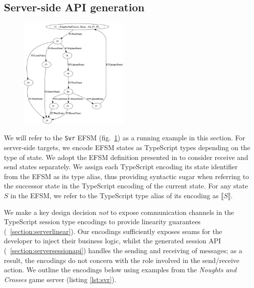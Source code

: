 \documentclass[submission,copyright,creativecommons]{eptcs}
\newcommand{\sectionref}[1]{\textsection~\ref{#1}}
\begin{document}
\subsection{Server-side API generation}
\label{section:server}

\begin{figure}
  \begin{center}
    \includegraphics[width=0.48\textwidth]{figures/efsm_svr.png}
  \end{center}

  \label{fig:efsmsvr}
\end{figure}

We will refer to the \texttt{Svr} EFSM (fig.~\ref{fig:efsmsvr}) as a running example in this section. For server-side targets, we encode EFSM states as TypeScript types depending on the type of state. We adopt the EFSM definition presented in \cite{Hybrid2016} to consider receive and send states separately. We assign each TypeScript encoding its state identifier from the EFSM as its type alias, thus providing syntactic sugar when referring to the successor state in the TypeScript encoding of the current state. For any state $S$ in the EFSM, we refer to the TypeScript type alias of its encoding as $\llbracket S \rrbracket$. 

We make a key design decision \textit{not} to expose communication channels in the TypeScript session type encodings to provide linearity guarantees (\sectionref{section:serverlinear}). Our encodings sufficiently exposes seams for the developer to inject their business logic, whilst the generated session API (\sectionref{section:serversessionapi}) handles the sending and receiving of messages; as a result, the encodings do not concern with the role involved in the send/receive action. We outline the encodings below using examples from the \textit{Noughts and Crosses} game server (listing \ref{lst:svr}).
\end{document}
